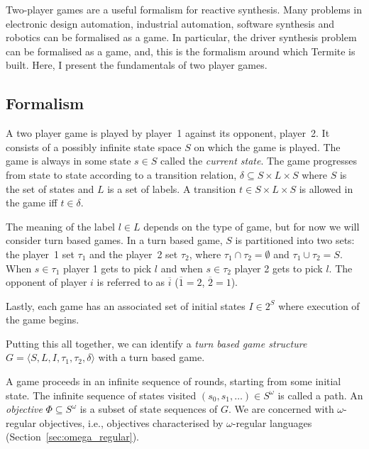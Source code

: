 Two-player games are a useful formalism for reactive synthesis. Many problems in electronic design automation, industrial automation, software synthesis and robotics can be formalised as a game. In particular, the driver synthesis problem can be formalised as a game, and, this is the formalism around which Termite is built. Here, I present the fundamentals of two player games. 

\subsection{Formalism}
\label{sec:intro_formal}

A two player game is played by player~1 against its opponent, player~2. It consists of a possibly infinite state space $S$ on which the game is played. The game is always in some state $s \in S$ called the \emph{current state}. The game progresses from state to state according to a transition relation, $\delta \subseteq S \times L \times S$ where $S$ is the set of states and $L$ is a set of labels. A transition $t \in S \times L \times S$ is allowed in the game iff $t \in \delta$. 

The meaning of the label $l \in L$ depends on the type of game, but for now we will consider turn based games. In a turn based game, $S$ is partitioned into two sets: the player~1 set $\tau_1$ and the player~2 set $\tau_2$, where $\tau_1 \cap \tau_2 = \emptyset$ and $ \tau_1 \cup \tau_2 = S$. When $s \in \tau_1$ player 1 gets to pick $l$ and when $s \in \tau_2$ player 2 gets to pick $l$. The opponent of player $i$ is referred to as $\overline{i}$ ($\overline{1} = 2$, $\overline{2} = 1$).

Lastly, each game has an associated set of initial states $I \in 2^S$ where execution of the game begins.

Putting this all together, we can identify a \emph{turn based game structure} $G = \langle S,L,I,\tau_1,\tau_2,\delta \rangle$ with a turn based game.

A game proceeds in an infinite sequence of rounds, starting from some initial state. The infinite sequence of states visited $(s_0, s_1,\ldots) \in S^\omega$ is called a path. An \emph{objective} $\Phi \subseteq S^\omega$ is a subset of state sequences of $G$. We are concerned with $\omega$-regular objectives, i.e., objectives characterised by $\omega$-regular languages (Section~\ref{sec:omega_regular}). 

